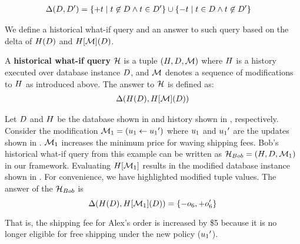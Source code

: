   \begin{align*}
    \iDiff{\db}{\db'} &=
\{ +t \mid t \not\in \db \wedge t \in \db' \} \cup \{ -t \mid t \in \db \wedge t \not\in \db' \}



  \end{align*}


  We define a historical what-if query and an answer to such query based on the delta of $H(D)$ and $H[\mathcal{M}](D)$.


\begin{defi}
A \textbf{historical what-if query} $\mathcal{H}$ is a tuple $(H, D, \mathcal{M})$ where $H$ is a  history executed over database instance $D$, and $\mathcal{M}$ denotes a sequence of modifications to $H$ as introduced above. 
The answer to $\mathcal{H}$ is defined as:
\begin{align*}
  \iDiff{\history(\db)}{\ahmod(\db)}

  \end{align*}
\end{defi}






















\begin{exam}
\label{ex:change-prob-example}
Let $D$ and $H$ be the database shown in  and history shown in , respectively. Consider the modification $\mathcal{M}_1 = (u_1 \gets {u_1}')$ where $u_1$ and ${u_1}'$ are the updates shown in . $\mathcal{M}_1$ increases the minimum price for waving shipping fees. 
Bob's historical what-if query from this example can be written as $\mathcal{H}_{Bob} = (H, D, \mathcal{M}_1)$ in our framework.
Evaluating $H[\mathcal{M}_1]$ results in the modified database instance shown in . For convenience, we have highlighted modified tuple values. The answer of the \abbrHW $\mathcal{H}_{Bob}$ is
\[
  \Delta(H(D),H[\mathcal{M}_1](D)) = \{ -o_6, +o_6'\}
\]


That is, the shipping fee for Alex's order is increased by \$5 because it is no longer eligible for free shipping under the new policy (${u_1}'$).



\end{exam}



